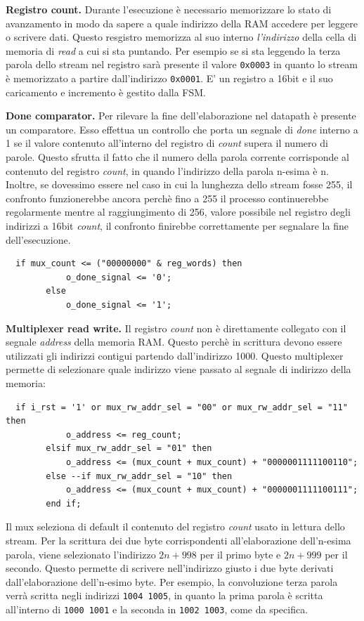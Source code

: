 \documentclass[a4paper]{report}
\begin{document}
\textbf{Registro count.} Durante l'esecuzione è necessario memorizzare lo stato di avanzamento in modo da sapere a quale indirizzo della RAM accedere per leggere o scrivere dati. Questo resgistro memorizza al suo interno \textit{l'indirizzo} della cella di memoria di \textit{read} a cui si sta puntando. Per esempio se si sta leggendo la terza parola dello stream nel registro sarà presente il valore \texttt{0x0003} in quanto lo stream è memorizzato a partire dall'indirizzo \texttt{0x0001}. E' un registro a 16bit e il suo caricamento e incremento è gestito dalla FSM.

\textbf{Done comparator.} Per rilevare la fine dell'elaborazione nel datapath è presente un comparatore. Esso effettua un controllo che porta un segnale di \textit{done} interno a 1 se il valore contenuto all'interno del registro di \textit{count} supera il numero di parole. Questo sfrutta il fatto che il numero della parola corrente corrisponde al contenuto del registro \textit{count}, in quando l'indirizzo della parola n-esima è n. Inoltre, se dovessimo essere nel caso in cui la lunghezza dello stream fosse 255, il confronto funzionerebbe ancora perchè fino a 255 il processo continuerebbe regolarmente mentre al raggiungimento di 256, valore possibile nel registro degli indirizzi a 16bit \textit{count}, il confronto finirebbe correttamente per segnalare la fine dell'esecuzione.
\begin{verbatim}
  if mux_count <= ("00000000" & reg_words) then
            o_done_signal <= '0';
        else
            o_done_signal <= '1';
\end{verbatim}

\textbf{Multiplexer read write.} Il registro \textit{count} non è direttamente collegato con il segnale \textit{address} della memoria RAM. Questo perchè in scrittura devono essere utilizzati gli indirizzi contigui partendo dall'indirizzo 1000. Questo multiplexer permette di selezionare quale indirizzo viene passato al segnale di indirizzo della memoria:
\begin{verbatim}
  if i_rst = '1' or mux_rw_addr_sel = "00" or mux_rw_addr_sel = "11" then
            o_address <= reg_count;
        elsif mux_rw_addr_sel = "01" then
            o_address <= (mux_count + mux_count) + "0000001111100110";
        else --if mux_rw_addr_sel = "10" then
            o_address <= (mux_count + mux_count) + "0000001111100111";
        end if;
\end{verbatim}
Il mux seleziona di default il contenuto del registro \textit{count} usato in lettura dello stream. Per la scrittura dei due byte corrispondenti all'elaborazione dell'n-esima parola, viene selezionato l'indirizzo $2n + 998$ per il primo byte e $2n + 999$ per il secondo. Questo permette di scrivere nell'indirizzo giusto i due byte derivati dall'elaborazione dell'n-esimo byte. Per esempio, la convoluzione terza parola verrà scritta negli indirizzi \texttt{1004 1005}, in quanto la prima parola è scritta all'interno di \texttt{1000 1001} e la seconda in \texttt{1002 1003}, come da specifica.
\end{document}
